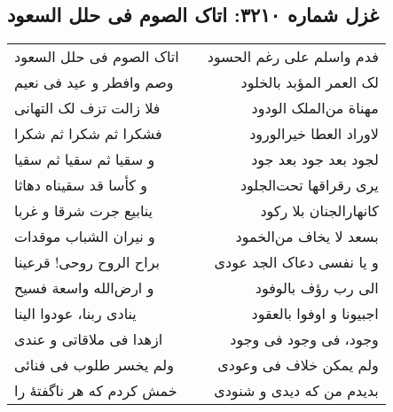 \begin{center}
\section*{غزل شماره ۳۲۱۰: اتاک الصوم فی حلل السعود}
\label{sec:3210}
\begin{longtable}{l p{0.5cm} r}
اتاک الصوم فی حلل السعود
&&
فدم واسلم علی رغم الحسود
\\
وصم وافطر و عید فی نعیم
&&
لک العمر المؤبد بالخلود
\\
فلا زالت تزف لک التهانی
&&
مهناة من‌الملک الودود
\\
فشکرا ثم شکرا ثم شکرا
&&
لاوراد العطا خیرالورود
\\
و سقیا ثم سقیا ثم سقیا
&&
لجود بعد جود بعد جود
\\
و کأسا قد سقیناه دهاثا
&&
یری رقراقها تحت‌الجلود
\\
ینابیع جرت شرقا و غربا
&&
کانهارالجنان بلا رکود
\\
و نیران الشباب موقدات
&&
بسعد لا یخاف من‌الخمود
\\
براح الروح روحی! قرعینا
&&
و یا نفسی دعاک الجد عودی
\\
و ارض‌الله واسعة فسیح
&&
الی رب رؤف بالوفود
\\
ینادی ربنا، عودوا الینا
&&
اجبیونا و اوفوا بالعقود
\\
ازهدا فی ملاقاتی و عندی
&&
وجود، فی وجود فی وجود
\\
ولم یخسر طلوب فی فنائی
&&
ولم یمکن خلاف فی وعودی
\\
خمش کردم که هر ناگفتهٔ را
&&
بدیدم من که دیدی و شنودی
\\
\end{longtable}
\end{center}
